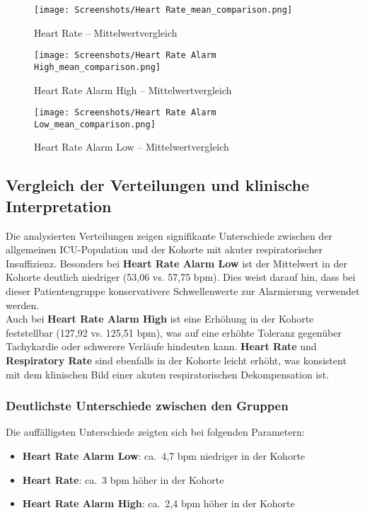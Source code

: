 \documentclass[12pt]{article}
\begin{document}
\begin{figure}[htbp]
\centering
\texttt{[image: Screenshots/Heart Rate\_mean\_comparison.png]}
\caption{Heart Rate – Mittelwertvergleich}
\label{fig:hr}
\end{figure}

\begin{figure}[htbp]
\centering
\texttt{[image: Screenshots/Heart Rate Alarm High\_mean\_comparison.png]}
\caption{Heart Rate Alarm High – Mittelwertvergleich}
\label{fig:hr_high}
\end{figure}

\begin{figure}[htbp]
\centering
\texttt{[image: Screenshots/Heart Rate Alarm Low\_mean\_comparison.png]}
\caption{Heart Rate Alarm Low – Mittelwertvergleich}
\label{fig:hr_low}
\end{figure}

\newpage
\subsection{Vergleich der Verteilungen und klinische Interpretation}

Die analysierten Verteilungen zeigen signifikante Unterschiede zwischen der allgemeinen ICU-Population und der Kohorte mit akuter respiratorischer Insuffizienz. Besonders bei \textbf{Heart Rate Alarm Low} ist der Mittelwert in der Kohorte deutlich niedriger (53{,}06 vs. 57{,}75 bpm). Dies weist darauf hin, dass bei dieser Patientengruppe konservativere Schwellenwerte zur Alarmierung verwendet werden.\\

Auch bei \textbf{Heart Rate Alarm High} ist eine Erhöhung in der Kohorte feststellbar (127{,}92 vs. 125{,}51 bpm), was auf eine erhöhte Toleranz gegenüber Tachykardie oder schwerere Verläufe hindeuten kann. \textbf{Heart Rate} und \textbf{Respiratory Rate} sind ebenfalls in der Kohorte leicht erhöht, was konsistent mit dem klinischen Bild einer akuten respiratorischen Dekompensation ist.

\subsubsection{Deutlichste Unterschiede zwischen den Gruppen}

Die auffälligsten Unterschiede zeigten sich bei folgenden Parametern:

\begin{itemize}
    \item \textbf{Heart Rate Alarm Low}: ca.\ 4{,}7 bpm niedriger in der Kohorte
    \item \textbf{Heart Rate}: ca.\ 3 bpm höher in der Kohorte
    \item \textbf{Heart Rate Alarm High}: ca.\ 2{,}4 bpm höher in der Kohorte
\end{itemize}
\end{document}
